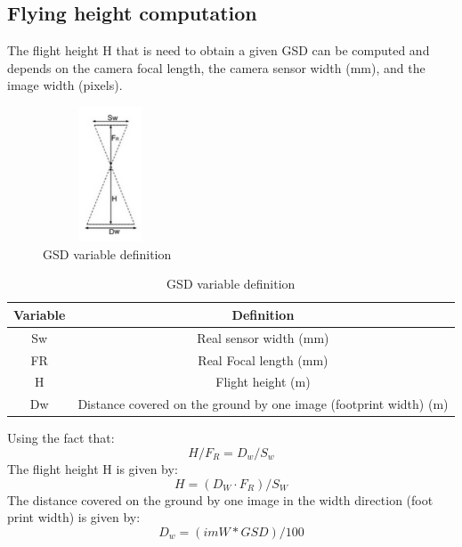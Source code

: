 \subsection{Flying height computation}
The flight height H that is need to obtain a given GSD can be computed and depends on the camera focal length, the camera sensor width  (mm), and the image width (pixels).\cite{GSDComputation}
\begin{figure}[H]
\centering
\includegraphics[width=4cm,height=4cm,keepaspectratio]{imagenes/GSD.PNG}
\caption{GSD variable definition}
\label{fig:GSD}
\end{figure}
\begin{table}[H]
\centering
\begin{tabular}{|c|c|}
\hline
\textbf{Variable} & \textbf{Definition}                                                                      \\ \hline
Sw                & Real sensor width (mm)                                                                   \\ \hline
FR                & Real Focal length (mm)                                                                   \\ \hline
H                 & Flight height (m)                                                                        \\ \hline
Dw                & Distance covered on the ground by one image (footprint width) (m) \\ \hline
\end{tabular}
\caption{GSD variable definition}
\end{table}
Using the fact that:
\begin{equation}
H/F_{R} = D_{w}/S_{w}
\end{equation}
The flight height H is given by:
\begin{equation}
H = (D_{W}\cdot F_{R})/S_{W}
\label{H}
\end{equation}
The distance covered on the ground by one image in the width direction (foot print width) is given by:
\begin{equation}
D_{w}=(imW*GSD)/100
\label{DW}
\end{equation}
